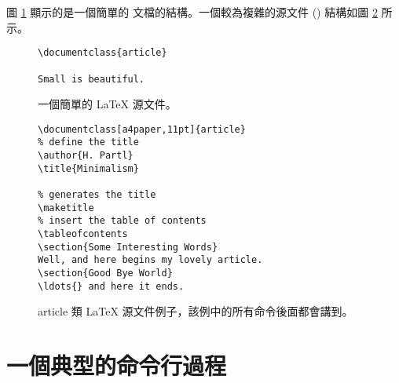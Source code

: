 
圖 \ref{mini} 顯示的是一個簡單的 \LaTeXe 文檔的結構。一個較為複雜的源文件 () 結構如圖 \ref{document} 所示。

\begin{figure}[!bp]
\begin{lined}{6cm}
\begin{verbatim}
\documentclass{article}

Small is beautiful.

\end{verbatim}
\end{lined}
\caption{一個簡單的 \LaTeX{} 源文件。} \label{mini}
\end{figure}

\begin{figure}[!bp]
\begin{lined}{10cm}
\begin{verbatim}
\documentclass[a4paper,11pt]{article}
% define the title
\author{H. Partl}
\title{Minimalism}

% generates the title
\maketitle
% insert the table of contents
\tableofcontents
\section{Some Interesting Words}
Well, and here begins my lovely article.
\section{Good Bye World}
\ldots{} and here it ends.

\end{verbatim}
\end{lined}
\caption[article 類例子。]{article 類 \LaTeX{} 源文件例子，該例中的所有命令後面都會講到。}
\label{document}

\end{figure}

\section{一個典型的命令行過程}

